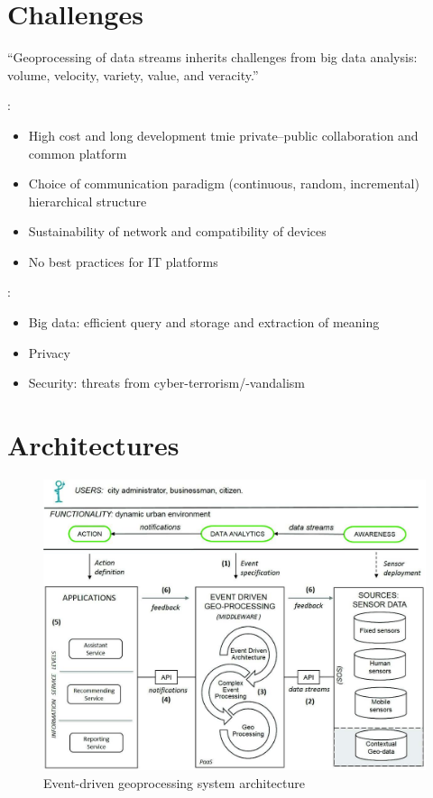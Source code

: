 \documentclass[parskip=half]{scrartcl}
\begin{document}
\section{Challenges}
\enquote{Geoprocessing of data streams inherits challenges from big data analysis: volume, velocity, variety, value, and veracity.}~\cite[p.~1]{Morales.2015}

\cite[p.~2~ff.]{Ahmed.2018}:
\begin{itemize}
	\item High cost and long development tmie \textrightarrow private--public collaboration and common platform
	\item Choice of communication paradigm (continuous, random, incremental) \textrightarrow hierarchical structure
	\item Sustainability of network and compatibility of devices
	\item No best practices for IT platforms
\end{itemize}

\cite[p.~9~f.]{Petrolo.2017}:
\begin{itemize}
	\item Big data: efficient query and storage and extraction of meaning
	\item Privacy
	\item Security: threats from cyber-terrorism/-vandalism
\end{itemize}


\section{Architectures}

\begin{figure}
	\centering
	\includegraphics[width=\textwidth]{Morales_2015}
	\caption{Event-driven geoprocessing system architecture~\cite[p.~3]{Morales.2015}}
	\label{fig:morales-arch}
\end{figure}
\end{document}
